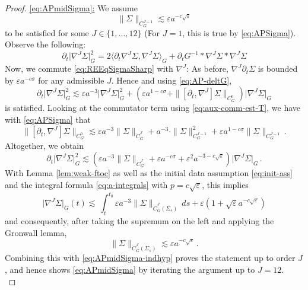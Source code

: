 \documentclass[11pt,leqno,textwidth=10cm]{amsart}
\numberwithin{equation}{section}
\theoremstyle{definition}
\theoremstyle{plain}
\newcommand{\1}{\mathbbm{1}}
\renewcommand{\epsilon}{\varepsilon}
\newcommand{\del}{\partial}
\newcommand{\change}[1]{\color{black}#1\color{black}}
\begin{document}
\begin{proof}
\underline{\eqref{eq:APmidSigma}:} We assume
\begin{equation}\label{eq:APmidSigma-indhyp}
\|\Sigma\|_{{C}^{J-1}_G}\lesssim \epsilon a^{-c\sqrt{\epsilon}}
\end{equation}
to be satisfied for some $J\in\{1,\dots,12\}$ (For $J=1$, this is true by \eqref{eq:APSigma}). Observe the following:
\[\del_t\lvert\nabla^J\Sigma\rvert_G^2=2\langle\del_t\nabla^J\Sigma,\nabla^J\Sigma\rangle_G+\del_tG^{-1}\ast\nabla^J\Sigma\ast\nabla^J\Sigma\]
Now, we commute \change{\eqref{eq:REEqSigmaSharp} }with $\nabla^J$: As before, $\nabla^J\del_t\Sigma$ is bounded by $\epsilon a^{-c\sigma}$ for any admissible $J$. Hence and using \eqref{eq:AP-deltG},
\[\del_t\lvert\nabla^J\Sigma\rvert_G^2\lesssim \epsilon a^{-3}\lvert\nabla^J\Sigma\rvert_G^2+\left(\epsilon a^{1-c\sigma}+\|[\del_t,\nabla^J]\Sigma\|_{C^0_G}\right)\lvert\nabla^J\Sigma\rvert_G\]
is satisfied. Looking at the commutator term using \eqref{eq:aux-comm-est-T}, we have with \eqref{eq:APSigma} that
\[\|[\del_t,\nabla^J]\Sigma\|_{C^0_G}\lesssim \epsilon a^{-3}\|\Sigma\|_{\dot{C}^J_G}+a^{-3}\cdot\|\Sigma\|_{C^{J-1}_G}^2+\epsilon a^{1-c\sigma}\|\Sigma\|_{C^{J-1}_G}\,.\]
Altogether, we obtain
\[\del_t\lvert\nabla^J\Sigma\rvert_G^2\lesssim\left(\epsilon a^{-3}\|\Sigma\|_{\dot{C}^J_G}+\epsilon a^{-c\sigma}+\epsilon^2a^{-3-c\sqrt{\epsilon}}\right)\lvert\nabla^J\Sigma\rvert_G\,.\]
With Lemma \ref{lem:weak-ftoc} as well as the initial data assumption \eqref{eq:init-ass} and the integral formula \eqref{eq:a-integrals} with $p=c\sqrt{\epsilon}$, this implies
\[\lvert\nabla^J\Sigma\rvert_G(t)\lesssim\,\int_t^{t_0}\epsilon a^{-3}\|\Sigma\|_{\dot{C}^J_G(\Sigma_s)}\,ds+\epsilon \left(1+\sqrt{\epsilon}a^{-c\sqrt{\epsilon}}\right)\]
and consequently, after taking the supremum on the left and applying the Gronwall lemma,
\[\|\Sigma\|_{\dot{C}^J_G(\Sigma_s)}\lesssim \epsilon a^{-c\sqrt{\epsilon}}\,.\]
Combining this with \eqref{eq:APmidSigma-indhyp} proves the statement up to order $J$, and hence shows \eqref{eq:APmidSigma} by iterating the argument up to $J=12$.\\


\end{proof}
\end{document}
